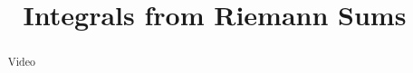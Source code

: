 \documentclass[handout]{ximera}
\title{Integrals from Riemann Sums}
\begin{document}
\begin{abstract} Video %
\end{abstract}

\maketitle

\end{document}
